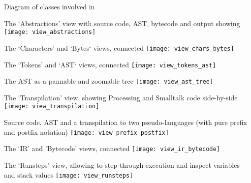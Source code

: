 \begin{cfigure}{Diagram of classes involved in }

\end{cfigure}

\begin{cfigure}{The `Abstractions' view with source code, \ac{AST}, bytecode and output showing}
\texttt{[image: view\_abstractions]}
\end{cfigure}

\begin{cfigure}{The `Characters' and `Bytes` views, connected}
\texttt{[image: view\_chars\_bytes]}
\end{cfigure}

\begin{cfigure}{The `Tokens' and `\ac{AST}` views, connected}
\texttt{[image: view\_tokens\_ast]}
\end{cfigure}

\begin{cfigure}{The \ac{AST} as a pannable and zoomable tree}
\texttt{[image: view\_ast\_tree]}
\end{cfigure}

\begin{cfigure}{The `Transpilation' view, showing Processing and Smalltalk code side-by-side}
\texttt{[image: view\_transpilation]}
\end{cfigure}

\begin{cfigure}{Source code, \ac{AST} and a transpilation to two pseudo-languages (with pure prefix and postfix notation)}
\texttt{[image: view\_prefix\_postfix]}
\end{cfigure}

\begin{cfigure}{The `\ac{IR}' and 'Bytecode' views, connected}
\texttt{[image: view\_ir\_bytecode]}
\end{cfigure}

\begin{cfigure}{The `Runsteps' view, allowing to step through execution and inspect variables and stack values}
\texttt{[image: view\_runsteps]}
\end{cfigure}

